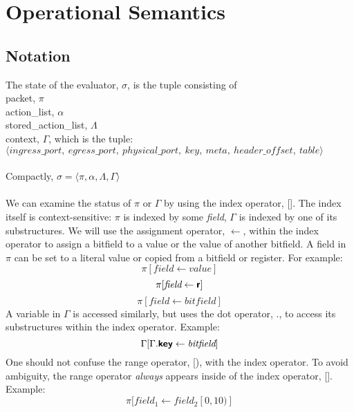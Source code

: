 
\section{Operational Semantics}

\subsection{Notation}

The state of the evaluator, $\sigma$, is the tuple consisting of \\
packet, $\pi$\\
action\_list, $\alpha$ \\
stored\_action\_list, $\Lambda$ \\
context, $\Gamma$, which is the tuple: \\
$\langle ingress\_port, \ egress\_port, \ physical\_port, \ key, \ meta, \ header\_offset, \ table \rangle$ \\ \\
Compactly, $\sigma = \langle \pi, \alpha, \Lambda, \Gamma \rangle$
\\ \\
We can examine the status of $\pi$ or $\Gamma$ by using the index operator, []. The index itself is context-sensitive: $\pi$ is indexed by some \textit{field}, $\Gamma$ is indexed by one of its substructures. We will use the assignment operator, $\leftarrow$, within the index operator to assign a bitfield to a value or the value of another bitfield.
A field in $\pi$ can be set to a literal value or copied from a bitfield or register. For example:
\begin{equation}
  \pi[\textit{field} \leftarrow \textit{value}]
\end{equation}
\begin{equation}
  \pi[\textit{field} \leftarrow \bm{\mathsf{{r}}}]
\end{equation}
\begin{equation}
  \pi[\textit{field} \leftarrow \textit{bitfield}]
\end{equation}
A variable in $\Gamma$ is accessed similarly, but uses the dot operator, ., to access its substructures within the index operator. Example:
\begin{equation}
  \Gamma[\Gamma.\bm{\mathsf{{key}}} \leftarrow \textit{bitfield}]
\end{equation}
One should not confuse the range operator, [), with the index operator. To avoid ambiguity, the range operator \textit{always} appears inside
of the index operator, []. Example:
\begin{equation}
  \pi[field_1 \leftarrow field_2[0, 10)]
\end{equation}

